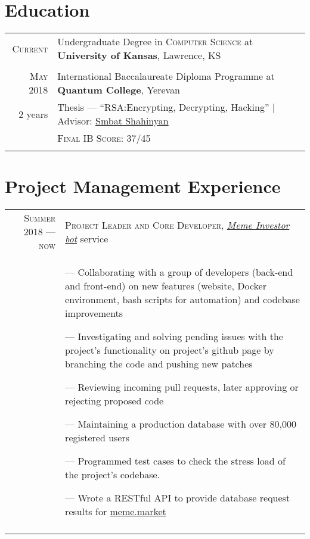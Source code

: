 \documentclass[a4paper,10pt]{article}
\begin{document}
\section{Education}
\begin{tabular}{rl}

  \textsc{Current} & Undergraduate Degree in \textsc{Computer Science} at \normalsize\textbf{University of Kansas}, Lawrence, KS\\
  \\
  
  \textsc{May} 2018& International Baccalaureate Diploma Programme at \textbf{Quantum College}, Yerevan\\
  2 years&Thesis --- ``RSA:\@ Encrypting, Decrypting, Hacking'' | Advisor: \href{http://www.ysu.am/persons/en/Smbat-Shahinyan}{Smbat Shahinyan}\\
                   &\textsc{Final IB Score}: 37/45 \\&\\
  
\end{tabular}

\section{Project Management Experience}
\begin{tabular}{r|p{11cm}}
  \textsc{Summer 2018 --- now} &  \textsc{Project Leader and Core Developer}, \emph{\href{https://github.com/MemeInvestor/memeinvestor_bot}{Meme Investor bot}} service\\&\footnotesize{
  --- Collaborating with a group of developers (back-end and front-end) on new features (website, Docker environment, bash scripts for automation) and codebase improvements

  --- Investigating and solving pending issues with the project's functionality on project's github page by branching the code and pushing new patches

  --- Reviewing incoming pull requests, later approving or rejecting proposed code

  --- Maintaining a production database with over 80,000 registered users

  --- Programmed test cases to check the stress load of the project's codebase.

  --- Wrote a RESTful API to provide database request results for \href{https://meme.market}{meme.market}
  } \\\multicolumn{2}{c}{}\\
\end{tabular}
\end{document}
